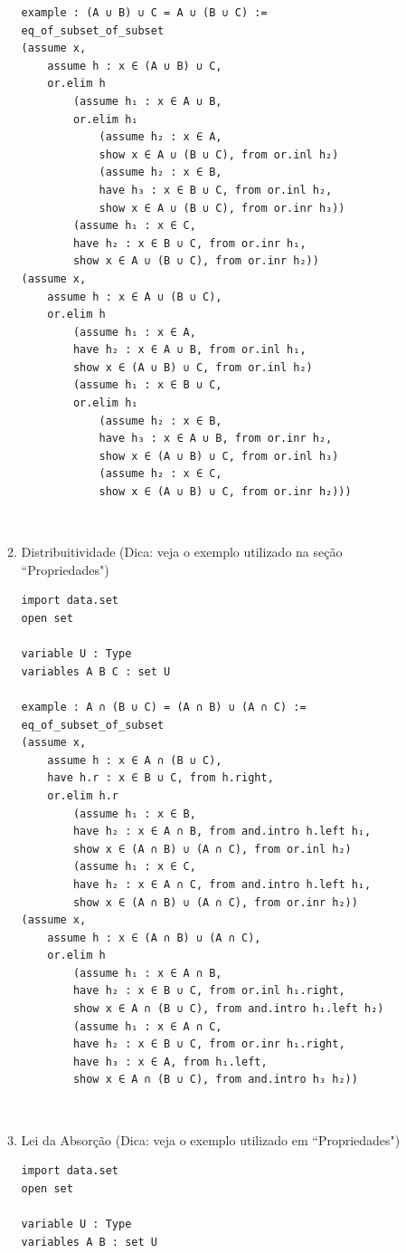 \begin{enumerate}
\begin{enumerate}
\begin{lstlisting}
example : (A ∪ B) ∪ C = A ∪ (B ∪ C) :=
eq_of_subset_of_subset
(assume x,
    assume h : x ∈ (A ∪ B) ∪ C,
    or.elim h
        (assume h₁ : x ∈ A ∪ B,
        or.elim h₁
            (assume h₂ : x ∈ A,
            show x ∈ A ∪ (B ∪ C), from or.inl h₂)
            (assume h₂ : x ∈ B,
            have h₃ : x ∈ B ∪ C, from or.inl h₂,
            show x ∈ A ∪ (B ∪ C), from or.inr h₃))
        (assume h₁ : x ∈ C,
        have h₂ : x ∈ B ∪ C, from or.inr h₁,
        show x ∈ A ∪ (B ∪ C), from or.inr h₂))
(assume x,
    assume h : x ∈ A ∪ (B ∪ C),
    or.elim h
        (assume h₁ : x ∈ A,
        have h₂ : x ∈ A ∪ B, from or.inl h₁,
        show x ∈ (A ∪ B) ∪ C, from or.inl h₂)
        (assume h₁ : x ∈ B ∪ C,
        or.elim h₁
            (assume h₂ : x ∈ B,
            have h₃ : x ∈ A ∪ B, from or.inr h₂,
            show x ∈ (A ∪ B) ∪ C, from or.inl h₃)
            (assume h₂ : x ∈ C,
            show x ∈ (A ∪ B) ∪ C, from or.inr h₂))) \end{lstlisting}

$\qquad$
\item Distribuitividade (Dica: veja o exemplo utilizado na seção ``Propriedades")
\begin{lstlisting}
import data.set
open set

variable U : Type
variables A B C : set U

example : A ∩ (B ∪ C) = (A ∩ B) ∪ (A ∩ C) :=
eq_of_subset_of_subset
(assume x,
    assume h : x ∈ A ∩ (B ∪ C),
    have h.r : x ∈ B ∪ C, from h.right,
    or.elim h.r
        (assume h₁ : x ∈ B,
        have h₂ : x ∈ A ∩ B, from and.intro h.left h₁,
        show x ∈ (A ∩ B) ∪ (A ∩ C), from or.inl h₂)
        (assume h₁ : x ∈ C,
        have h₂ : x ∈ A ∩ C, from and.intro h.left h₁,
        show x ∈ (A ∩ B) ∪ (A ∩ C), from or.inr h₂))
(assume x,
    assume h : x ∈ (A ∩ B) ∪ (A ∩ C),
    or.elim h
        (assume h₁ : x ∈ A ∩ B,
        have h₂ : x ∈ B ∪ C, from or.inl h₁.right,
        show x ∈ A ∩ (B ∪ C), from and.intro h₁.left h₂)
        (assume h₁ : x ∈ A ∩ C,
        have h₂ : x ∈ B ∪ C, from or.inr h₁.right,
        have h₃ : x ∈ A, from h₁.left,
        show x ∈ A ∩ (B ∪ C), from and.intro h₃ h₂)) \end{lstlisting}

$\qquad$
\item Lei da Absorção (Dica: veja o exemplo utilizado em ``Propriedades")
\begin{lstlisting}
import data.set
open set

variable U : Type
variables A B : set U


\end{lstlisting}
\end{enumerate}
\end{enumerate}
